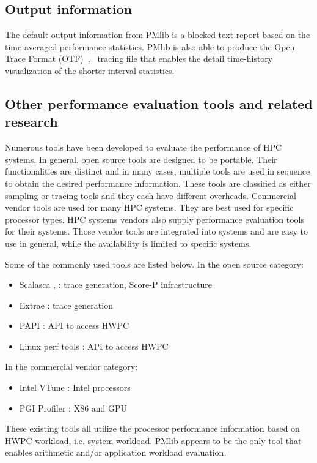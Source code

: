 \documentclass[conference]{IEEEtran}
\begin{document}
\subsection{Output information}
\label{subsection:PMlib-output-information}
The default output information from PMlib is a blocked text report based on
the time-averaged performance statistics.
PMlib is also able to produce the
Open Trace Format (OTF)~\cite{Knupfer:2006},~\cite{OTF:webpage-public}
tracing file that enables the detail time-history visualization of
the shorter interval statistics.
%
%


\subsection{Other performance evaluation tools and related research}
\label{subsection:related-research}
Numerous tools have been developed to evaluate the performance of HPC systems.
In general, open source tools are designed to be portable.
Their functionalities are distinct and in many cases, multiple tools
are used in sequence to obtain the desired performance information.
These tools are classified as either sampling or tracing tools
and they each have different overheads.
Commercial vendor tools are used for many HPC systems.
They are best used for specific processor types.
HPC systems vendors also supply performance evaluation tools for their systems.
Those vendor tools are integrated into systems
and are easy to use in general,
while the availability is limited to specific systems.

Some of the commonly used tools are listed below.
In the open source category:
\begin{itemize}
	\item Scalasca \cite{Scalasca:2017},\cite{Scalasca:2010}
			: trace generation, Score-P infrastructure
	\item Extrae \cite{Extrae:webpage} :  trace generation
	\item PAPI \cite{PAPI:5.6} : API to access HWPC
	\item Linux perf tools : API to access HWPC
\end{itemize}
In the commercial vendor category:
\begin{itemize}
		\item Intel VTune \cite{Intel:VTune} : Intel processors
		\item PGI Profiler \cite{PGI:Profiler} : X86 and GPU
\end{itemize}
These existing tools all utilize the processor performance information
based on HWPC workload, i.e. system workload.
PMlib appears to be the only tool that enables arithmetic and/or application
workload evaluation.
\end{document}
